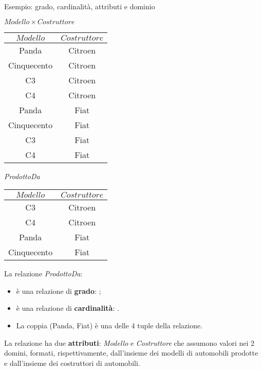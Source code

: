 \begin{frame}{Esempio: grado, cardinalit\`a, attributi e dominio}
\vspace{-.7cm}
\begin{minipage}[t]{0.48\linewidth}
    \begin{center}
        $Modello \times Costruttore$
        
        \begin{tabular}{|c|c|}
            \hline
            \rowcolor{cyan!30}$Modello$ & $Costruttore$ \\
            \hline
            Panda & Citroen \\ \hline
            Cinquecento & Citroen \\ \hline
            C3 & Citroen \\ \hline
            C4 & Citroen \\ \hline
            Panda & Fiat \\ \hline
            Cinquecento & Fiat \\ \hline
            C3 & Fiat \\ \hline
            C4 & Fiat \\ \hline
        \end{tabular}
    \end{center}
\end{minipage}%
\hfill%
\begin{minipage}[t]{0.5\linewidth}
    \begin{center}
        \textit{ProdottoDa}

        \begin{tabular}{|c|c|}
            \hline
            \rowcolor{cyan!30}$Modello$ & $Costruttore$ \\
            \hline
            C3 & Citroen \\ \hline
            C4 & Citroen \\ \hline
            Panda & Fiat \\ \hline
            Cinquecento & Fiat \\ \hline
        \end{tabular}
    \end{center}
\pause
La relazione \textit{ProdottoDa}:
\begin{itemize}
    \item \`e una relazione di \textbf{grado}: ;
    \item \`e una relazione di \textbf{cardinalit\`a}: .
    \item La coppia (Panda, Fiat) \`e una delle 4 tuple della relazione.
\end{itemize}
\end{minipage}
\pause

\vspace{.5cm}
La relazione ha due \textbf{attributi}: \textit{Modello} e \textit{Costruttore} che assumono valori nei 2 domini, formati, rispettivamente, dall'insieme dei modelli di automobili prodotte e dall'insieme dei costruttori di automobili.
\end{frame}
